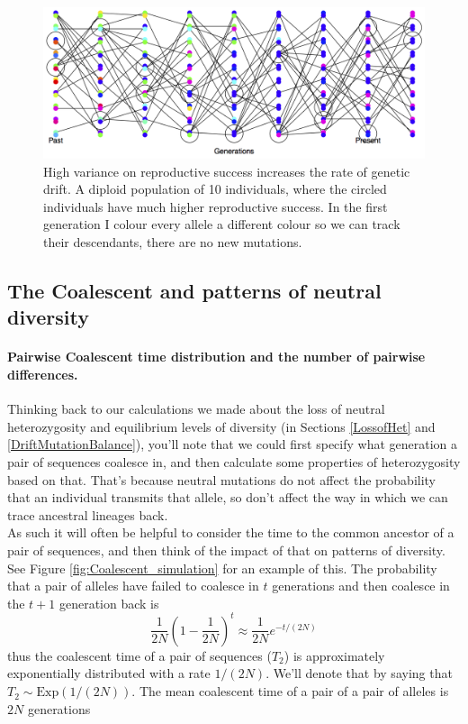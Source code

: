 \begin{figure}
\begin{center}
\includegraphics[width= \textwidth]{figures/Loss_of_he_col_alleles_varying_RS.png}

\end{center}
\caption{High variance on reproductive success increases the rate of genetic drift. A diploid population of 10 individuals, where the circled
  individuals have much higher reproductive success. In the first generation I colour every allele a different
colour so we can track their descendants, there are no new
  mutations.} \label{fig:LossHet_varying_RS}
\end{figure} 


\subsection{The Coalescent and patterns of neutral diversity}

\paragraph{Pairwise Coalescent time distribution and the number of
 pairwise differences.}
Thinking back to our calculations we made about the loss of neutral heterozygosity
and equilibrium levels of diversity (in Sections \ref{LossofHet} and \ref{DriftMutationBalance}), you'll note that we could first specify
what generation a pair of sequences coalesce in, and then calculate
some properties of heterozygosity based on that. That's because neutral
mutations do not affect the probability that an individual transmits
that allele, so don't affect the way in which we can trace ancestral lineages
back. \\

As such it will often be helpful to consider the time to the common
ancestor of a pair of sequences, and then think of the impact of that
on patterns of diversity. See Figure \ref{fig:Coalescent_simulation}
for an example of this. The probability that a pair of alleles
have failed to coalesce in $t$ generations and then coalesce in the
$t+1$ generation back is
\begin{equation}
  \frac{1}{2N} \left(1- \frac{1}{2N} \right)^{t} \approx \frac{1}{2N} e^{-t/(2N)} \label{eqn:coal_time_dist}
\end{equation}
thus the coalescent time of a pair of sequences ($T_2$) is
approximately exponentially distributed with a rate $1/(2N)$. We'll denote that by
saying that $T_2 \sim \text{Exp}\left( 1/(2N) \right)$. The mean coalescent
time of a pair of a pair of alleles is $2N$ generations\\


